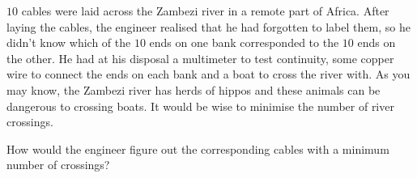 \documentclass[12pt]{exam}
\begin{document}
\begin{questions}
\question $10$ cables were laid across the Zambezi river in a remote part of Africa. After laying the cables, the engineer realised that he had forgotten to label them, so he didn't know which of the $10$ ends on one bank corresponded to the $10$ ends on the other. He had at his disposal a multimeter to test continuity, some copper wire to connect the ends on each bank and a boat to cross the river with.  As you may know, the Zambezi river has herds of hippos and these  animals can be dangerous to crossing boats. It would be wise to minimise the number of river crossings.

How would the engineer figure out the corresponding cables with a minimum number of crossings?
\end{questions}
\end{document}

